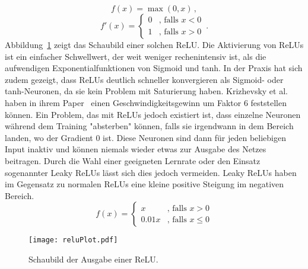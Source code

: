 \begin{equation}
	f(x) = \max(0, x) \, ,
\end{equation}
\begin{equation*}
	f'(x) = \begin{cases}
	0 &\text{, falls $x < 0$}\\
	1 &\text{, falls $x > 0$}
	\end{cases} \, .
\end{equation*}
Abbildung~\ref{reluoutput} zeigt das Schaubild einer solchen ReLU. 
Die Aktivierung von ReLUs ist ein einfacher Schwellwert, der weit weniger rechenintensiv ist, als die aufwendigen Exponentialfunktionen von Sigmoid und tanh.
In der Praxis hat sich zudem gezeigt, dass ReLUs deutlich schneller konvergieren als Sigmoid- oder tanh-Neuronen, da sie kein Problem mit Saturierung haben.
Krizhevsky et al. haben in ihrem Paper~\cite{NIPS2012_4824} einen Geschwindigkeitsgewinn um Faktor 6 feststellen können.
Ein Problem, das mit ReLUs jedoch existiert ist, dass einzelne Neuronen während dem Training "absterben" können, falls sie irgendwann in dem Bereich landen, wo der Gradient 0 ist.
Diese Neuronen sind dann für jeden beliebigen Input inaktiv und können niemals wieder etwas zur Ausgabe des Netzes beitragen.
Durch die Wahl einer geeigneten Lernrate oder den Einsatz sogenannter Leaky ReLUs lässt sich dies jedoch vermeiden.
Leaky ReLUs haben im Gegensatz zu normalen ReLUs eine kleine positive Steigung im negativen Bereich.
\begin{equation}
	f(x) = \begin{cases}
		x &\text{, falls } x  >  0\\
		0.01 x &\text{, falls } x  \leq  0
	\end{cases}
\end{equation} 


\begin{figure}[h]
	\centering
	\texttt{[image: reluPlot.pdf]}
	\caption{Schaubild der Ausgabe einer ReLU.}
	\label{reluoutput}
\end{figure}




